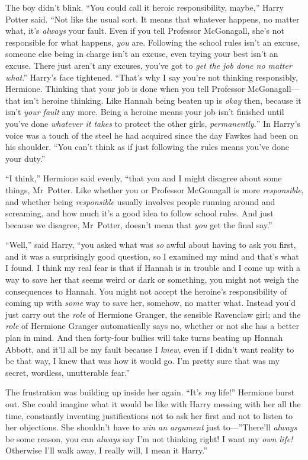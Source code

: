 The boy didn’t blink. “You could call it heroic responsibility, maybe,” Harry Potter said. “Not like the usual sort. It means that whatever happens, no matter what, it’s \emph{always} your fault. Even if you tell Professor McGonagall, she’s not responsible for what happens, \emph{you} are. Following the school rules isn’t an excuse, someone else being in charge isn’t an excuse, even trying your best isn’t an excuse. There just aren’t any excuses, you’ve got to \emph{get the job done no matter what}.” Harry’s face tightened. “That’s why I say you’re not thinking responsibly, Hermione. Thinking that your job is done when you tell Professor McGonagall—that isn’t heroine thinking. Like Hannah being beaten up is \emph{okay} then, because it isn’t \emph{your fault} any more. Being a heroine means your job isn’t finished until you’ve done \emph{whatever it takes} to protect the other girls, \emph{permanently.}” In Harry’s voice was a touch of the steel he had acquired since the day Fawkes had been on his shoulder. “You can’t think as if just following the rules means you’ve done your duty.”

“I think,” Hermione said evenly, “that you and I might disagree about some things, Mr~Potter. Like whether you or Professor McGonagall is more \emph{responsible}, and whether being \emph{responsible} usually involves people running around and screaming, and how much it’s a good idea to follow school rules. And just because we disagree, Mr~Potter, doesn’t mean that \emph{you} get the final say.”

“Well,” said Harry, “you asked what was \emph{so} awful about having to ask you first, and it was a surprisingly good question, so I examined my mind and that’s what I found. I think my real fear is that if Hannah is in trouble and I come up with a way to save her that seems weird or dark or something, you might not weigh the consequences to Hannah. You might not accept the heroine’s responsibility of coming up with \emph{some} way to save her, somehow, no matter what. Instead you’d just carry out the \emph{role} of Hermione Granger, the sensible Ravenclaw girl; and the \emph{role} of Hermione Granger automatically says no, whether or not she has a better plan in mind. And then forty-four bullies will take turns beating up Hannah Abbott, and it’ll all be my fault because I \emph{knew,} even if I didn’t want reality to be that way, I knew that was how it would go. I’m pretty sure that was my secret, wordless, unutterable fear.”

The frustration was building up inside her again. “It’s \emph{my} life!” Hermione burst out. She could imagine what it would be like with Harry messing with her all the time, constantly inventing justifications not to ask her first and not to listen to her objections. She shouldn’t have to \emph{win an argument} just to—”There’ll \emph{always} be some reason, you can \emph{always} say I’m not thinking right! I want my \emph{own life!} Otherwise I’ll walk away, I really will, I mean it Harry.”

